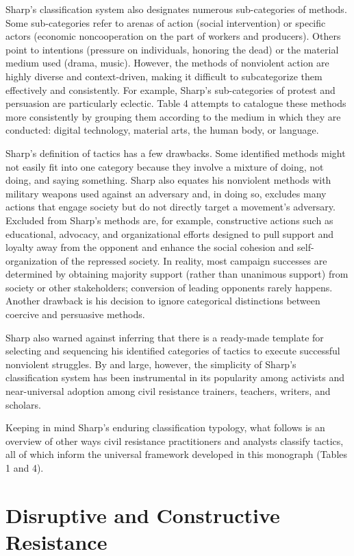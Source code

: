 \documentclass[twoside,a4paper,12pt,fleqn,openany]{extbook}
\begin{document}
Sharp’s classification system also designates numerous sub-categories of methods. Some sub-categories refer to arenas of action (social intervention) or specific actors (economic noncooperation on the part of workers and producers). Others point to intentions (pressure on individuals, honoring the dead) or the material medium used (drama, music). However, the methods of nonviolent action are highly diverse and context-driven, making it difficult to subcategorize them effectively and consistently. For example, Sharp’s sub-categories of protest and persuasion are particularly eclectic. Table 4 attempts to catalogue these methods more consistently by grouping them according to the medium in which they are conducted: digital technology, material arts, the human body, or language.

Sharp’s definition of tactics has a few drawbacks. Some identified methods might not easily fit into one category because they involve a mixture of doing, not doing, and saying something. Sharp also equates his nonviolent methods with military weapons used against an adversary and, in doing so, excludes many actions that engage society but do not directly target a movement’s adversary. Excluded from Sharp’s methods are, for example, constructive actions such as educational, advocacy, and organizational efforts designed to pull support and loyalty away from the opponent and enhance the social cohesion and self-organization of the repressed society. In reality, most campaign successes are determined by obtaining majority support (rather than unanimous support) from society or other stakeholders; conversion of leading opponents rarely happens. Another drawback is his decision to ignore categorical distinctions between coercive and persuasive methods.

Sharp also warned against inferring that there is a ready-made template for selecting and sequencing his identified categories of tactics to execute successful nonviolent struggles. By and large, however, the simplicity of Sharp’s classification system has been instrumental in its popularity among activists and near-universal adoption among civil resistance trainers, teachers, writers, and scholars.

Keeping in mind Sharp’s enduring classification typology, what follows is an overview of other ways civil resistance practitioners and analysts classify tactics, all of which inform the universal framework developed in this monograph (Tables 1 and 4).

\section*{Disruptive and Constructive Resistance}
\end{document}
